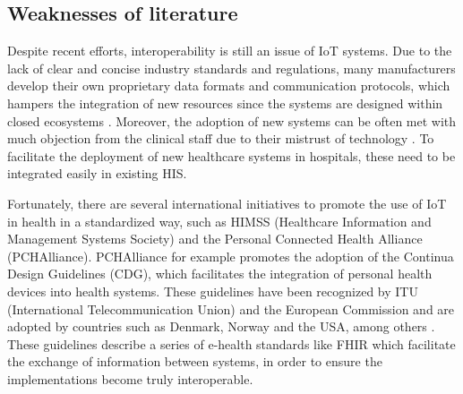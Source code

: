 \clearpage
\subsection{Weaknesses of literature}
\label{sec:weaknesses}



Despite recent efforts, interoperability is still an issue of \acs{IoT} systems. Due to the lack of clear and concise industry standards and regulations, many manufacturers develop their own proprietary data formats and communication protocols, which hampers the integration of new resources since the systems are designed within closed ecosystems \cite{Rubi2019}. Moreover, the adoption of new systems can be often met with much objection from the clinical staff due to their mistrust of technology \cite{DursunErgezen2020}. 
To facilitate the deployment of new healthcare systems in hospitals, these need to be integrated easily in existing \acs{HIS}. \bigskip

Fortunately, there are several international initiatives to promote the use of \acs{IoT} in health in a standardized way, such as HIMSS (Healthcare Information and Management Systems Society) and the Personal Connected Health Alliance (PCHAlliance). PCHAlliance for example promotes the adoption of the Continua Design Guidelines (CDG), which facilitates the integration of personal health devices into health systems. These guidelines have been recognized by ITU (International Telecommunication Union) and the European Commission and are adopted by countries such as Denmark, Norway and the USA, among others \cite{PersonalConnectedHealthAlliance2017}. These guidelines describe a series of e-health standards like \acs{FHIR} which facilitate the exchange of information between systems, in order to ensure the implementations become truly interoperable.

